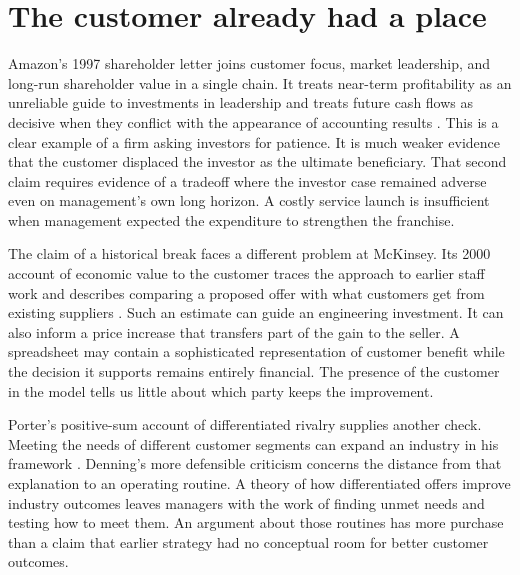 \documentclass[11pt]{article}
\begin{document}
\section{The customer already had a place}
Amazon's 1997 shareholder letter joins customer focus, market leadership, and long-run shareholder value in a single chain. It treats near-term profitability as an unreliable guide to investments in leadership and treats future cash flows as decisive when they conflict with the appearance of accounting results \citep{amazon1997shareholderletter}. This is a clear example of a firm asking investors for patience. It is much weaker evidence that the customer displaced the investor as the ultimate beneficiary. That second claim requires evidence of a tradeoff where the investor case remained adverse even on management's own long horizon. A costly service launch is insufficient when management expected the expenditure to strengthen the franchise.

The claim of a historical break faces a different problem at McKinsey. Its 2000 account of economic value to the customer traces the approach to earlier staff work and describes comparing a proposed offer with what customers get from existing suppliers \citep{mckinsey2000delivering}. Such an estimate can guide an engineering investment. It can also inform a price increase that transfers part of the gain to the seller. A spreadsheet may contain a sophisticated representation of customer benefit while the decision it supports remains entirely financial. The presence of the customer in the model tells us little about which party keeps the improvement.

Porter's positive-sum account of differentiated rivalry supplies another check. Meeting the needs of different customer segments can expand an industry in his framework \citep{porter2008five}. Denning's more defensible criticism concerns the distance from that explanation to an operating routine. A theory of how differentiated offers improve industry outcomes leaves managers with the work of finding unmet needs and testing how to meet them. An argument about those routines has more purchase than a claim that earlier strategy had no conceptual room for better customer outcomes.
\end{document}
